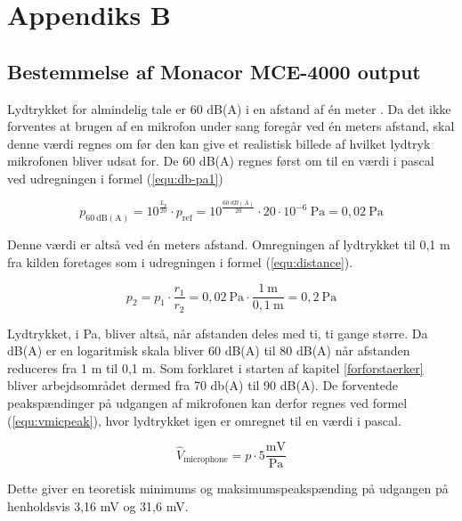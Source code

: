 \chapter{Appendiks B}
\section*{Bestemmelse af Monacor MCE-4000 output}
Lydtrykket for almindelig tale er 60 dB(A) i en afstand af én meter \cite{lidt_om_lyd}. Da det ikke forventes at brugen af en mikrofon under sang foregår ved én meters  afstand, skal denne værdi regnes om før den kan give et realistisk billede af hvilket lydtryk mikrofonen bliver udsat for. De 60 dB(A) regnes først om til en værdi i pascal ved udregningen i formel (\ref{equ:db-pa1})

\begin{equation}
\label{equ:db-pa1}
p_{\mathrm{60~dB(A)}} = 10^{\frac{L_p}{20}} \cdot p_{\mathrm{ref}} = 10^{\frac{60~dB(A)}{20}} \cdot 20 \cdot 10^{-6}~\mathrm{Pa} = 0,02~\mathrm{Pa}
\end{equation}

Denne værdi er altså ved én meters afstand. Omregningen af lydtrykket til 0,1 m fra kilden foretages som i udregningen i formel (\ref{equ:distance}).

\begin{equation}
\label{equ:distance}
p_2 = p_1 \cdot \frac{r_1}{r_2} = 0,02~\mathrm{Pa} \cdot \frac{1~\mathrm{m}}{0,1~\mathrm{m}} = 0,2~\mathrm{Pa}
\end{equation}

Lydtrykket, i Pa, bliver altså, når afstanden deles med ti, ti gange større. Da dB(A) er en logaritmisk skala bliver 60 dB(A) til 80 dB(A) når afstanden reduceres fra 1 m til 0,1 m. Som forklaret i starten af kapitel \ref{forforstaerker} bliver arbejdsområdet dermed fra 70 db(A) til 90 dB(A). De forventede peakspændinger på udgangen af mikrofonen kan derfor regnes ved formel (\ref{equ:vmicpeak}), hvor lydtrykket igen er omregnet til en værdi i pascal.

\begin{equation}
\label{equ:vmicpeak}
\hat{V}_{\mathrm{microphone}} = p \cdot 5\frac{\mathrm{mV}}{\mathrm{Pa}}
\end{equation}

Dette giver en teoretisk minimums og maksimumspeakspænding på udgangen på henholdsvis 3,16 mV og 31,6 mV.
